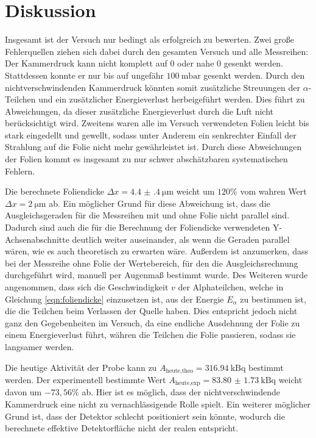 \newpage
\section{Diskussion}
\label{sec:Diskussion}

Insgesamt ist der Versuch nur bedingt als erfolgreich zu bewerten. Zwei große Fehlerquellen ziehen sich dabei durch den gesamten Versuch und alle Messreihen: Der Kammerdruck kann nicht komplett auf $0$ oder nahe $0$ gesenkt werden. Stattdessen konnte er nur bis auf ungefähr $\SI{100}{\milli\bar}$ gesenkt werden. Durch den nichtverschwindenden Kammerdruck
könnten somit zusätzliche Streuungen der $\alpha$-Teilchen und ein zusätzlicher
Energieverlust herbeigeführt werden. Dies führt zu Abweichungen, da dieser zusätzliche Energieverlust durch die Luft nicht berücksichtigt wird.
Zweitens waren alle im Versuch verwendeten Folien leicht bis stark eingedellt und gewellt, sodass unter Anderem ein senkrechter Einfall der Strahlung auf die Folie nicht mehr gewährleistet ist. Durch diese Abweichungen der Folien kommt es insgesamt zu nur schwer abschätzbaren systematischen Fehlern.

Die berechnete Foliendicke $\Delta x = \SI{4.4(4)}{\micro\metre}$ weicht um
$120\%$ vom wahren Wert $\Delta x = \SI{2}{\micro\metre}$ ab. Ein möglicher Grund für diese
Abweichung ist, dass die Ausgleichsgeraden für die Messreihen mit und ohne Folie
nicht parallel sind. Dadurch sind auch die für die Berechnung der Foliendicke verwendeten
Y-Achsenabschnitte deutlich weiter auseinander, als wenn die Geraden parallel wären,
wie es auch theoretisch zu erwarten wäre. Außerdem ist anzumerken, dass
bei der Messreihe ohne Folie der Wertebereich, für den die Ausgleichsrechnung durchgeführt wird,
manuell per Augenmaß bestimmt wurde.
Des Weiteren wurde angenommen, dass sich die Geschwindigkeit $v$ der Alphateilchen, welche in Gleichung \eqref{eqn:foliendicke} einzusetzen ist, aus der Energie $E_\alpha$ zu bestimmen ist, die die Teilchen beim Verlassen der Quelle haben. Dies entspricht jedoch nicht ganz den Gegebenheiten im Versuch, da eine endliche Ausdehnung der Folie zu einem Energieverlust führt, währen die Teilchen die Folie passieren, sodass sie langsamer werden.

Die heutige Aktivität der Probe kann zu $A_{\text{heute,theo}}= \SI{316.94}{\kilo\becquerel}$
bestimmt werden. Der experimentell bestimmte Wert
$A_{\text{heute,exp}}=\SI{83.80(173)}{\kilo\becquerel}$ weicht davon um
$-73{,}56\%$ ab. Hier ist es möglich, dass der nichtverschwindende Kammerdruck eine nicht zu vernachlässigende Rolle spielt. Ein weiterer  möglicher Grund ist, dass der Detektor
schlecht positioniert sein könnte, wodurch die berechnete effektive Detektorfläche
nicht der realen entspricht.

